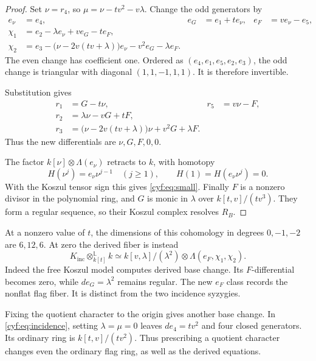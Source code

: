 \begin{proof}
Set \(\nu=r_4\), so
\(\mu=\nu-tv^2-v\lambda\). Change the odd generators by
\begin{align*}
 e_\nu&=e_4,&e_G&=e_1+te_\nu,&e_F&=ve_\nu-e_5,\\
 \chi_1&=e_2-\lambda e_\nu+ve_G-te_F,\\
 \chi_2&=e_3-\bigl(\nu-2v(tv+\lambda)\bigr)e_\nu
                         -v^2e_G-\lambda e_F.
\end{align*}
The even change has coefficient one. Ordered as
\((e_4,e_1,e_5,e_2,e_3)\), the odd change is triangular
with diagonal \((1,1,-1,1,1)\). It is therefore invertible.

Substitution gives
\[
\begin{aligned}
 r_1&=G-t\nu,&r_5&=v\nu-F,\\
 r_2&=\lambda\nu-vG+tF,\\
 r_3&=\bigl(\nu-2v(tv+\lambda)\bigr)\nu+v^2G+\lambda F.
\end{aligned}
\]
Thus the new differentials are \(\nu,G,F,0,0\).

The factor \(k[\nu]\otimes\Lambda(e_\nu)\) retracts to
\(k\), with homotopy
\[
 H(\nu^j)=e_\nu\nu^{j-1}\quad(j\geq1),\qquad
 H(1)=H(e_\nu\nu^j)=0.
\]
With the Koszul tensor sign this gives \eqref{cyf:eq:small}.
Finally \(F\) is a nonzero divisor in the polynomial ring,
and \(G\) is monic in \(\lambda\) over \(k[t,v]/(tv^3)\).
They form a regular sequence, so their Koszul complex
resolves \(R_B\).
\end{proof}

At a nonzero value of \(t\), the dimensions of this
cohomology in degrees \(0,-1,-2\) are \(6,12,6\).
At zero the derived fiber is instead
\begin{equation}\label{cyf:eq:derived-fiber}
 K_{\mathrm{inc}}\otimes^{\mathbb L}_{k[t]}k
 \simeq k[v,\lambda]/(\lambda^2)
               \otimes\Lambda(e_F,\chi_1,\chi_2).
\end{equation}
Indeed the free Koszul model computes derived base change.
Its \(F\)-differential becomes zero, while
\(de_G=\lambda^2\) remains regular. The new \(e_F\)
class records the nonflat flag fiber. It is distinct from
the two incidence syzygies.

Fixing the quotient character to the origin gives another
base change. In \eqref{cyf:eq:incidence}, setting
\(\lambda=\mu=0\) leaves \(de_4=tv^2\) and four
closed generators. Its ordinary ring is \(k[t,v]/(tv^2)\).
Thus prescribing a quotient character changes even the
ordinary flag ring, as well as the derived equations.


